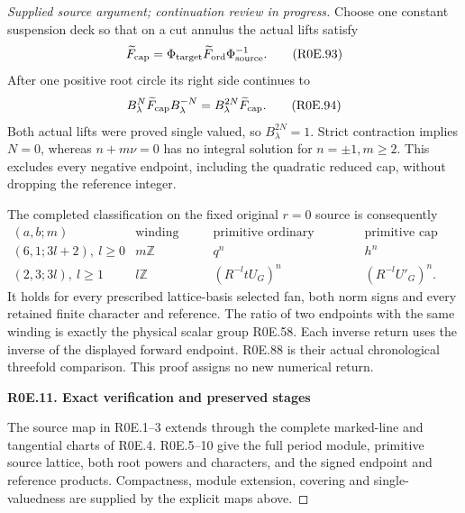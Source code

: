 \begin{proof}[Supplied source argument; continuation review in progress]
Choose one constant suspension deck so that on a cut annulus
the actual lifts satisfy
\[
 \widetilde F_{\rm cap}
   =\Phi_{\rm target}\widetilde F_{\rm ord}\Phi_{\rm source}^{-1}.
 \tag{R0E.93}
\]
After one positive root circle its right side continues to
\[
 B_\lambda^N\widetilde F_{\rm cap}B_\lambda^{-N}
                   =B_\lambda^{2N}\widetilde F_{\rm cap}.
 \tag{R0E.94}
\]
Both actual lifts were proved single valued, so
\(B_\lambda^{2N}=1\). Strict contraction implies \(N=0\), whereas
\(n+m\nu=0\) has no integral solution for \(n=\pm1,m\ge2\).
This excludes every negative endpoint, including the quadratic
reduced cap, without dropping the reference integer.

The completed classification on the fixed original \(r=0\) source
is consequently
\[
 \begin{array}{c|c|c|c}
 (a,b;m)&\text{winding group}&\text{primitive ordinary forward map}
                                &\text{primitive cap map}\\ \hline
 (6,1;3l+2),\ l\ge0&m\mathbb Z&q^n&h^n\\
 (2,3;3l),\ l\ge1&l\mathbb Z&(R^{-l}tU_G)^n&(R^{-l}U'_G)^n .
 \end{array}                                                       \tag{R0E.95}
\]
It holds for every prescribed lattice-basis selected fan, both
norm signs and every retained finite character and reference.
The ratio of two endpoints with the same winding is exactly
the physical scalar group R0E.58. Each inverse return uses the
inverse of the displayed forward endpoint. R0E.88 is their
actual chronological threefold comparison. This proof assigns
no new numerical return.

\par

\medskip\noindent\textbf{R0E.11. Exact verification and preserved stages}

\par\nobreak

The source map in R0E.1--3 extends through the complete marked-line
and tangential charts of R0E.4. R0E.5--10 give the full period module,
primitive source lattice, both root powers and characters, and the signed
endpoint and reference products. Compactness, module extension, covering
and single-valuedness are supplied by the explicit maps above.


\end{proof}
